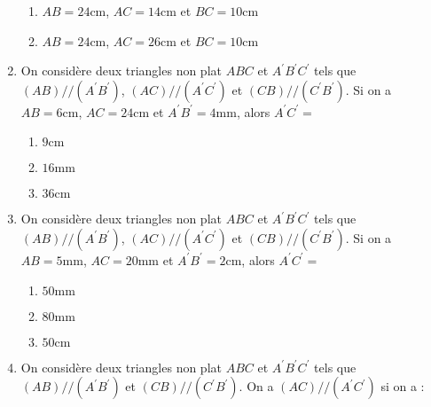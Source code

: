 \documentclass[oneside,twoside]{book}
\begin{document}
\begin{enumerate}
\begin{enumerate}
\item\MauvaiseReponse $AB=24\mathrm{cm}$, $AC=14\mathrm{cm}$ et $BC=10\mathrm{cm}$
\item\BonneReponse $AB=24\mathrm{cm}$, $AC=26\mathrm{cm}$ et $BC=10\mathrm{cm}$

\end{enumerate}



\item On considère deux triangles non plat $ABC$ et $A^\prime B^\prime C^\prime$ tels que $\left(AB\right)//\left(A^{\prime}B^{\prime}\right)$, $\left(AC\right)//\left(A^{\prime}C^{\prime}\right)$ et $\left(CB\right)//\left(C^{\prime}B^{\prime}\right)$. Si on a $AB=6\mathrm{cm}$, $AC=24\mathrm{cm}$ et $A^{\prime}B^{\prime}=4\mathrm{mm}$, alors $A^{\prime}C^{\prime}=$

\begin{enumerate}


\item\MauvaiseReponse $9\mathrm{cm}$

\item\BonneReponse $16\mathrm{mm}$
\item\MauvaiseReponse $36\mathrm{cm}$

\end{enumerate}



\item On considère deux triangles non plat $ABC$ et $A^\prime B^\prime C^\prime$ tels que $\left(AB\right)//\left(A^{\prime}B^{\prime}\right)$, $\left(AC\right)//\left(A^{\prime}C^{\prime}\right)$ et $\left(CB\right)//\left(C^{\prime}B^{\prime}\right)$. Si on a $AB=5\mathrm{mm}$, $AC=20\mathrm{mm}$ et $A^{\prime}B^{\prime}=2\mathrm{cm}$, alors $A^{\prime}C^{\prime}=$

\begin{enumerate}


\item\MauvaiseReponse $50\mathrm{mm}$
\item\BonneReponse $80\mathrm{mm}$

\item\MauvaiseReponse $50\mathrm{cm}$

\end{enumerate}






\item On considère deux triangles non plat $ABC$ et $A^\prime B^\prime C^\prime$ tels que $\left(AB\right)//\left(A^{\prime}B^{\prime}\right)$ et $\left(CB\right)//\left(C^{\prime}B^{\prime}\right)$. On a $\left(AC\right)//\left(A^{\prime}C^{\prime}\right)$ si on a :


\end{enumerate}
\end{document}
